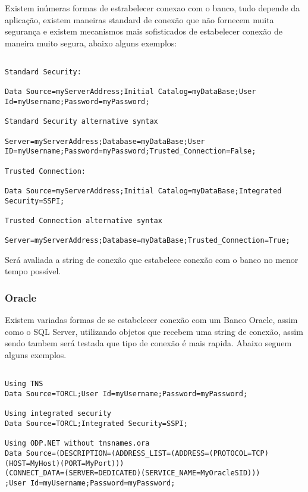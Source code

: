 Existem inúmeras formas de estrabelecer conexao com o banco, tudo depende da aplicação, existem maneiras standard de conexão que não fornecem muita segurança e existem mecanismos mais sofisticados de estabelecer conexão de maneira muito segura, abaixo alguns exemplos:

\scriptsize

\begin{verbatim}

Standard Security:

Data Source=myServerAddress;Initial Catalog=myDataBase;User Id=myUsername;Password=myPassword;

Standard Security alternative syntax

Server=myServerAddress;Database=myDataBase;User ID=myUsername;Password=myPassword;Trusted_Connection=False;

Trusted Connection:

Data Source=myServerAddress;Initial Catalog=myDataBase;Integrated Security=SSPI;

Trusted Connection alternative syntax

Server=myServerAddress;Database=myDataBase;Trusted_Connection=True;

\end{verbatim}

\normalsize

Será avaliada a string de conexão que estabelece conexão com o banco no menor tempo possível. \cite{sqlstring}

\subsubsection{Oracle}

Existem variadas formas de se estabelecer conexão com um Banco Oracle, assim como o SQL Server, utilizando objetos que recebem uma string de conexão, assim sendo tambem será testada que tipo de conexão é mais rapida. Abaixo seguem alguns exemplos.

\scriptsize

\begin{verbatim}

Using TNS
Data Source=TORCL;User Id=myUsername;Password=myPassword;

Using integrated security
Data Source=TORCL;Integrated Security=SSPI;

Using ODP.NET without tnsnames.ora
Data Source=(DESCRIPTION=(ADDRESS_LIST=(ADDRESS=(PROTOCOL=TCP)(HOST=MyHost)(PORT=MyPort)))
(CONNECT_DATA=(SERVER=DEDICATED)(SERVICE_NAME=MyOracleSID)))
;User Id=myUsername;Password=myPassword;

\end{verbatim}

